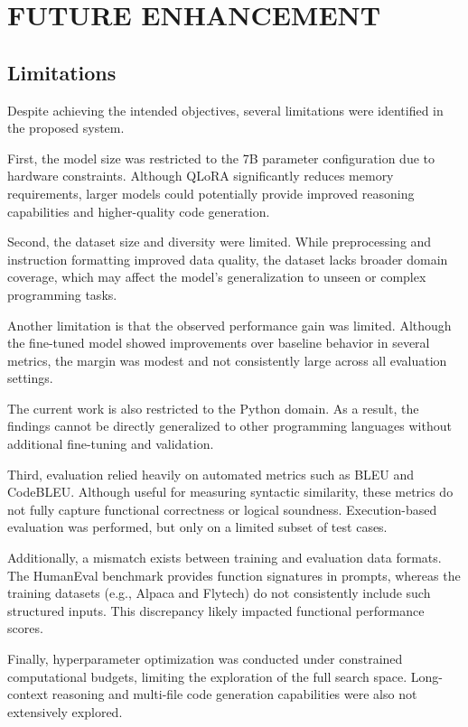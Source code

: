 \chapter{FUTURE ENHANCEMENT}

\section{Limitations}

Despite achieving the intended objectives, several limitations were identified in the proposed system.

First, the model size was restricted to the 7B parameter configuration due to hardware constraints. Although QLoRA significantly reduces memory requirements, larger models could potentially provide improved reasoning capabilities and higher-quality code generation.

Second, the dataset size and diversity were limited. While preprocessing and instruction formatting improved data quality, the dataset lacks broader domain coverage, which may affect the model’s generalization to unseen or complex programming tasks.

Another limitation is that the observed performance gain was limited. Although the fine-tuned model showed improvements over baseline behavior in several metrics, the margin was modest and not consistently large across all evaluation settings.

The current work is also restricted to the Python domain. As a result, the findings cannot be directly generalized to other programming languages without additional fine-tuning and validation.

Third, evaluation relied heavily on automated metrics such as BLEU and CodeBLEU. Although useful for measuring syntactic similarity, these metrics do not fully capture functional correctness or logical soundness. Execution-based evaluation was performed, but only on a limited subset of test cases.

Additionally, a mismatch exists between training and evaluation data formats. The HumanEval benchmark provides function signatures in prompts, whereas the training datasets (e.g., Alpaca and Flytech) do not consistently include such structured inputs. This discrepancy likely impacted functional performance scores.

Finally, hyperparameter optimization was conducted under constrained computational budgets, limiting the exploration of the full search space. Long-context reasoning and multi-file code generation capabilities were also not extensively explored.

